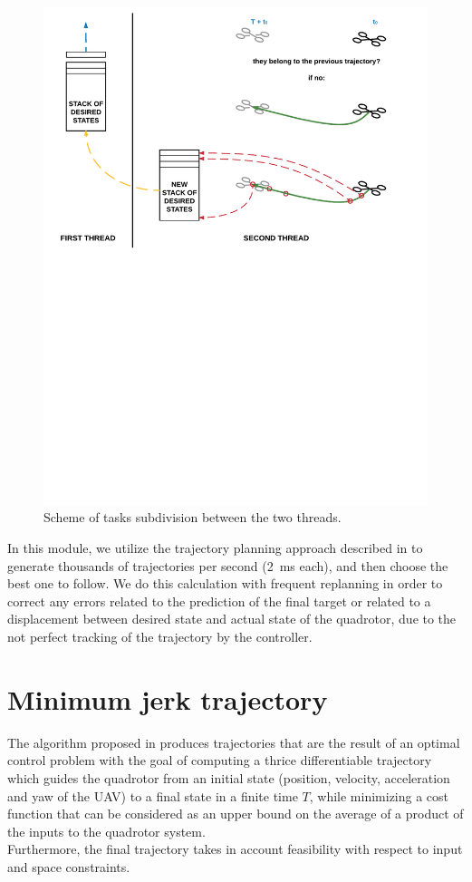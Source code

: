 \begin{figure}[!htbp]
    \centering
    \includegraphics[width=1.0\textwidth]{img/threads_trajectory_generation.pdf}
    \caption{Scheme of tasks subdivision between the two threads.}
    \label{fig:traject_gen}
\end{figure}

In this module, we utilize the trajectory planning approach described in \cite{mueller2015computationally} to generate thousands of trajectories per second (\SI{2}{\milli \second} each), and then choose the best one to follow. We do this calculation with frequent replanning in order to correct any errors related to the prediction of the final target or related to a displacement between desired state and actual state of the quadrotor, due to the not perfect tracking of the trajectory by the controller.\\

\section{Minimum jerk trajectory}
The algorithm proposed in \cite{mueller2015computationally} produces trajectories that are the result of an optimal control problem with the goal of computing a thrice differentiable trajectory which guides the quadrotor from an initial state (position, velocity, acceleration and yaw of the UAV) to a final state in a finite time $T$, while minimizing a cost function that can be considered as an upper bound on the average of a product of the inputs to the quadrotor system.\\ Furthermore, the final trajectory takes in account feasibility with respect to input and space constraints.
